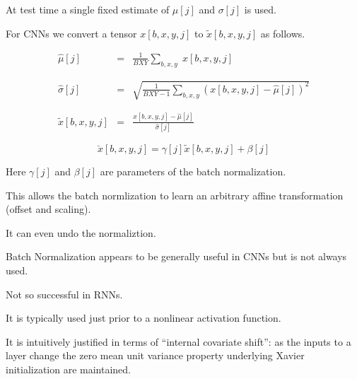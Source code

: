 {\vfill
At test time a single fixed estimate of $\mu[j]$ and $\sigma[j]$ is used.


For CNNs we convert a tensor $x[b,x,y,j]$ to $\tilde{x}[b,x,y,j]$ as follows.

\begin{eqnarray*}
  \hat{\mu}[j] & = & \frac{1}{BXY} \sum_{b,x,y}\;x[b,x,y,j] \\
  \\
  \\
  \hat{\sigma}[j] & = & \sqrt{\frac{1}{BXY-1} \sum_{b,x,y} (x[b,x,y,j]-\hat{\mu}[j])^2} \\
  \\
  \\
  \tilde{x}[b,x,y,j]& = & \frac{x[b,x,y,j] - \hat{\mu}[j]}{\hat{\sigma}[j]}
\end{eqnarray*}


$$\breve{x}[b,x,y,j] = \gamma[j] \tilde{x}[b,x,y,j] + \beta[j]$$

\vfill
Here $\gamma[j]$ and $\beta[j]$ are parameters of the batch normalization.

\vfill
This allows the batch normlization to learn an arbitrary affine transformation (offset and scaling).

\vfill
It can even undo the normaliztion.


Batch Normalization appears to be generally useful in CNNs but is not always used.

\vfill
Not so successful in RNNs.

\vfill
It is typically used just prior to a nonlinear activation function.

\vfill
It is intuitively justified in terms of ``internal covariate shift'':
as the inputs to a layer change the zero mean unit variance property underlying Xavier initialization are maintained.

}
